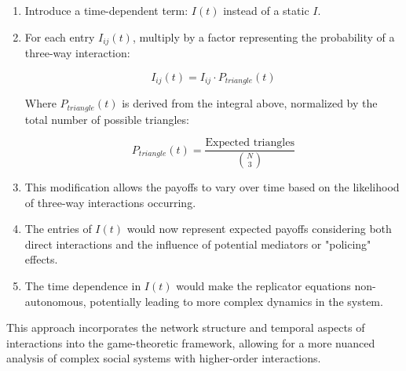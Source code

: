 \documentclass{article}
\begin{document}
\begin{enumerate}
\item Introduce a time-dependent term: \(I(t)\) instead of a static \(I\).
\item For each entry \(I_{ij}(t)\), multiply by a factor representing the probability of a three-way interaction:

\[
I_{ij}(t) = I_{ij} \cdot P_{triangle}(t)
\]

Where \(P_{triangle}(t)\) is derived from the integral above, normalized by the total number of possible triangles:

\[
P_{triangle}(t) = \frac{\text{Expected triangles}}{\binom{N}{3}}
\]

\item This modification allows the payoffs to vary over time based on the likelihood of three-way interactions occurring.
\item The entries of \(I(t)\) would now represent expected payoffs considering both direct interactions and the influence of potential mediators or "policing" effects.
\item The time dependence in \(I(t)\) would make the replicator equations non-autonomous, potentially leading to more complex dynamics in the system.
\end{enumerate}

This approach incorporates the network structure and temporal aspects of interactions into the game-theoretic framework, allowing for a more nuanced analysis of complex social systems with higher-order interactions.
\end{document}
